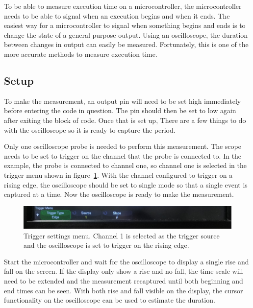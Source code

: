 \documentclass{article}
\begin{document}
  To be able to measure execution time on a microcontroller, the microcontroller
  needs to be able to signal when an execution begins and when it ends. The
  easiest way for a microcontroller to signal when something begins and ends is
  to change the state of a general purpose output. Using an oscilloscope, the
  duration between changes in output can easily be measured.  Fortunately, this
  is one of the more accurate methods to measure execution time.

  \subsection{Setup}

  To make the measurement, an output pin will need to be set high immediately
  before entering the code in question. The pin should then be set to low again
  after exiting the block of code. Once that is set up, There are a few things
  to do with the oscilloscope so it is ready to capture the period.

  Only one oscilloscope probe is needed to perform this measurement. The scope
  needs to be set to trigger on the channel that the probe is connected to. In
  the example, the probe is connected to channel one, so channel one is selected
  in the trigger menu shown in figure~\ref{fig:exectime_trigger}. With the
  channel configured to trigger on a rising edge, the oscilloscope should be set
  to single mode so that a single event is captured at a time. Now the
  oscilloscope is ready to make the measurement.

  \begin{figure}[h]
    \includegraphics[width=\textwidth]{images/exec_time/trigger_menu.jpg}
    \caption{Trigger settings menu. Channel 1 is selected as the trigger source
      and the oscilloscope is set to trigger on the rising edge.}
    \label{fig:exectime_trigger}
  \end{figure}

  Start the microcontroller and wait for the oscilloscope to display a single
  rise and fall on the screen. If the display only show a rise and no fall, the
  time scale will need to be extended and the measurement recaptured until both
  beginning and end times can be seen.
  With both rise and fall visible on the
  display, the cursor functionality on the oscilloscope can be used to estimate
  the duration.
\end{document}
